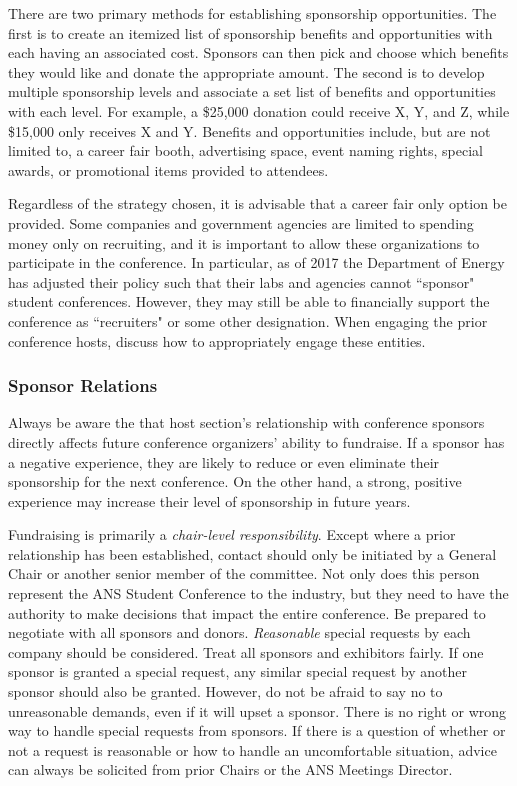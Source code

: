 \documentclass[12pt]{article}
\begin{document}
There are two primary methods for establishing sponsorship opportunities.
The first is to create an itemized list of sponsorship benefits and opportunities with each having an associated cost.
Sponsors can then pick and choose which benefits they would like and donate the appropriate amount.
The second is to develop multiple sponsorship levels and associate a set list of benefits and opportunities with each level.
For example, a \$25,000 donation could receive X, Y, and Z, while \$15,000 only receives X and Y. 
Benefits and opportunities include, but are not limited to, a career fair booth, advertising space, event naming rights, special awards, or promotional items provided to attendees.

Regardless of the strategy chosen, it is advisable that a career fair only option be provided.
Some companies and government agencies are limited to spending money only on recruiting, and it is important to allow these organizations to participate in the conference. 
In particular, as of 2017 the Department of Energy has adjusted their policy such that their labs and agencies cannot ``sponsor" student conferences.
However, they may still be able to financially support the conference as ``recruiters" or some other designation. 
When engaging the prior conference hosts, discuss how to appropriately engage these entities.

\subsubsection{Sponsor Relations}
Always be aware the that host section's relationship with conference sponsors directly affects future conference organizers' ability to fundraise.
If a sponsor has a negative experience, they are likely to reduce or even eliminate their sponsorship for the next conference.
On the other hand, a strong, positive experience may increase their level of sponsorship in future years.

Fundraising is primarily a \emph{chair-level responsibility}.
Except where a prior relationship has been established, contact should only be initiated by a General Chair or another senior member of the committee.
Not only does this person represent the ANS Student Conference to the industry, but they need to have the authority to make decisions that impact the entire conference.
Be prepared to negotiate with all sponsors and donors.
\emph{Reasonable} special requests by each company should be considered.
Treat all sponsors and exhibitors fairly.
If one sponsor is granted a special request, any similar special request by another sponsor should also be granted.
However, do not be afraid to say no to unreasonable demands, even if it will upset a sponsor.
There is no right or wrong way to handle special requests from sponsors.
If there is a question of whether or not a request is reasonable or how to handle an uncomfortable situation, advice can always be solicited from prior Chairs or the ANS Meetings Director.
\end{document}
